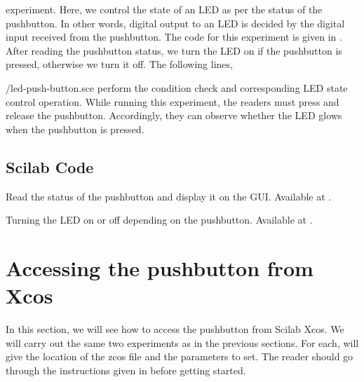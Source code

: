 \begin{enumerate}
  experiment. Here, we control the state of an LED as per the status
  of the pushbutton. In other words, digital output to an LED is
  decided by the digital input received from the pushbutton. The code
  for this experiment is given in . After reading
  the pushbutton status, we turn the LED on if the pushbutton is
  pressed, otherwise we turn it off. The following lines,
  
  {\LocPushscicode/led-push-button.sce} perform the condition check
  and corresponding LED state control operation. While running this experiment, the readers 
  must press and release the pushbutton. Accordingly, they can observe whether 
  the LED glows when the pushbutton is pressed. 
\end{enumerate}

\subsection{Scilab Code}
\label{sec:push-scilab-code}

\begin{scicode}
{Read the status of the pushbutton and display it on the GUI.  Available at
  .}
\label{sci:push-100}

\end{scicode}

\begin{scicode}
  {Turning the LED on or off depending on the pushbutton.  Available at
  .}
\label{sci:push-200}

\end{scicode}




\section{Accessing the pushbutton from Xcos}
\label{sec:push-xcos}
In this section, we will see how to access the pushbutton from Scilab
Xcos.  We will carry out the same two experiments as in the previous
sections.  For each, will give the location of the zcos file and the
parameters to set.  The reader should go through the instructions
given in  before getting started.

